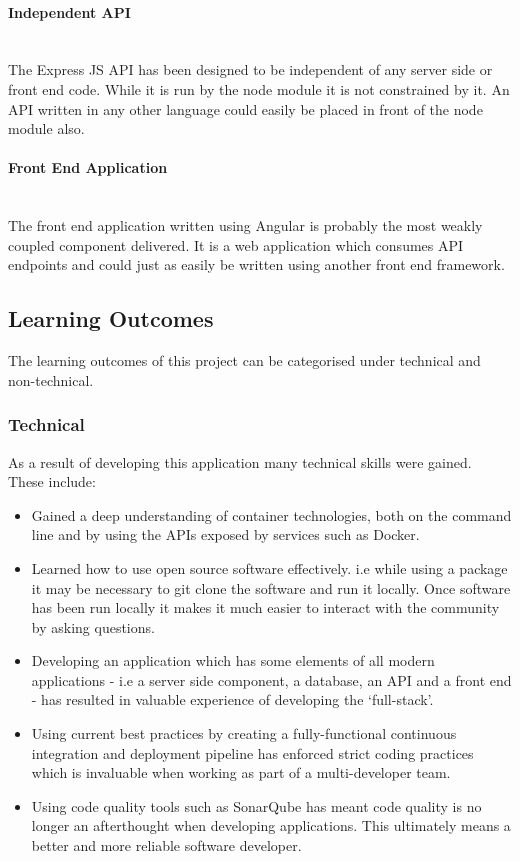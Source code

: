 \paragraph{Independent API}\mbox{}\\
The Express JS API has been designed to be independent of any server side or front end code. While it is run by the node module it is not constrained by it. An API written in any other language could easily be placed in front of the node module also. 

\paragraph{Front End Application}\mbox{}\\
The front end application written using Angular is probably the most weakly coupled component delivered. It is a web application which consumes API endpoints and could just as easily be written using another front end framework.

\subsection{Learning Outcomes}
The learning outcomes of this project can be categorised under technical and non-technical.

\subsubsection{Technical}
As a result of developing this application many technical skills were gained. These include:

\begin{itemize}
	\item Gained a deep understanding of container technologies, both on the command line and by using the APIs exposed by services such as Docker.
	\item Learned how to use open source software effectively. i.e while using a package it may be necessary to git clone the software and run it locally. Once software has been run locally it makes it much easier to interact with the community by asking questions.
	\item Developing an application which has some elements of all modern applications - i.e a server side component, a database, an API and a front end - has resulted in valuable experience of developing the `full-stack'.
	\item Using current best practices by creating a fully-functional continuous integration and deployment pipeline has enforced strict coding practices which is invaluable when working as part of a multi-developer team.
	\item Using code quality tools such as SonarQube has meant code quality is no longer an afterthought when developing applications. This ultimately means a better and more reliable software developer. 
\end{itemize}

